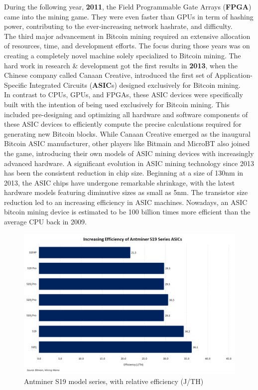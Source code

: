 \newpage
\noindent During the following year, \textbf{2011}, the Field Programmable Gate Arrays (\textbf{FPGA}) came into the mining game. They were even faster than GPUs in term of hashing power, contributing to the ever-increasing network hashrate, and difficulty.\\
The third major advancement in Bitcoin mining required an extensive allocation of resources, time, and development efforts. The focus during those years was on creating a completely novel machine solely specialized to Bitcoin mining. The hard work in research \& development got the first results in \textbf{2013},  when the Chinese company called Canaan Creative, introduced the first set of Application-Specific Integrated Circuits (\textbf{ASIC}s) designed exclusively for Bitcoin mining.\\
In contrast to CPUs, GPUs, and FPGAs, these ASIC devices were specifically built with the intention of being used exclusively for Bitcoin mining. This included pre-designing and optimizing all hardware and software components of these ASIC devices to efficiently compute the precise calculations required for generating new Bitcoin blocks. While Canaan Creative emerged as the inaugural Bitcoin ASIC manufacturer, other players like Bitmain and MicroBT also joined the game, introducing their own models of ASIC mining devices with increasingly advanced hardware. A significant evolution in ASIC mining technology since 2013 has been the consistent reduction in chip size. Beginning at a size of 130nm in 2013, the ASIC chips have undergone remarkable shrinkage, with the latest hardware models featuring diminutive sizes as small as 5nm. The transistor size reduction led to an increasing efficiency in ASIC machines. Nowadays, an ASIC bitcoin mining device is estimated to be 100 billion times more efficient than the average CPU back in 2009. 
\begin{figure}[h!]
\centering
\includegraphics[width=12.5cm]{Figures/mining/s19-efficiency.png}
\caption{Antminer S19 model series, with relative efficiency (J/TH)}
\label{fig:s19-efficiency}
\end{figure}